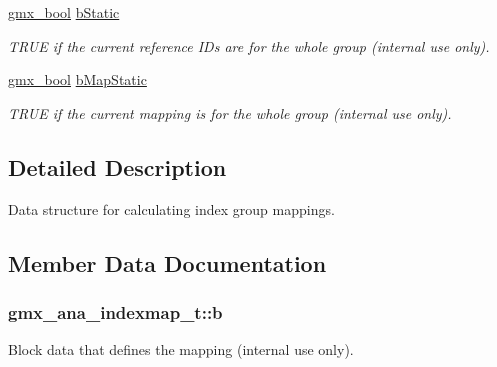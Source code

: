 \begin{DoxyCompactItemize}
\hyperlink{include_2types_2simple_8h_a8fddad319f226e856400d190198d5151}{gmx\-\_\-bool} \hyperlink{structgmx__ana__indexmap__t_a52010e6efe7e14189c9571d92b87172c}{b\-Static}
\begin{DoxyCompactList}\small\item\em \-T\-R\-U\-E if the current reference \-I\-Ds are for the whole group (internal use only). \end{DoxyCompactList}\item 
\hyperlink{include_2types_2simple_8h_a8fddad319f226e856400d190198d5151}{gmx\-\_\-bool} \hyperlink{structgmx__ana__indexmap__t_a3923b2b17056e49ee7d60fc95b3d6775}{b\-Map\-Static}
\begin{DoxyCompactList}\small\item\em \-T\-R\-U\-E if the current mapping is for the whole group (internal use only). \end{DoxyCompactList}\end{DoxyCompactItemize}


\subsection{\-Detailed \-Description}
\-Data structure for calculating index group mappings. 

\subsection{\-Member \-Data \-Documentation}
\hypertarget{structgmx__ana__indexmap__t_aea46d1a0ff405c100ab4466ea7092529}{
\subsubsection[{b}]{ {\bf gmx\-\_\-ana\-\_\-indexmap\-\_\-t\-::b}}}\label{structgmx__ana__indexmap__t_aea46d1a0ff405c100ab4466ea7092529}


\-Block data that defines the mapping (internal use only). 

